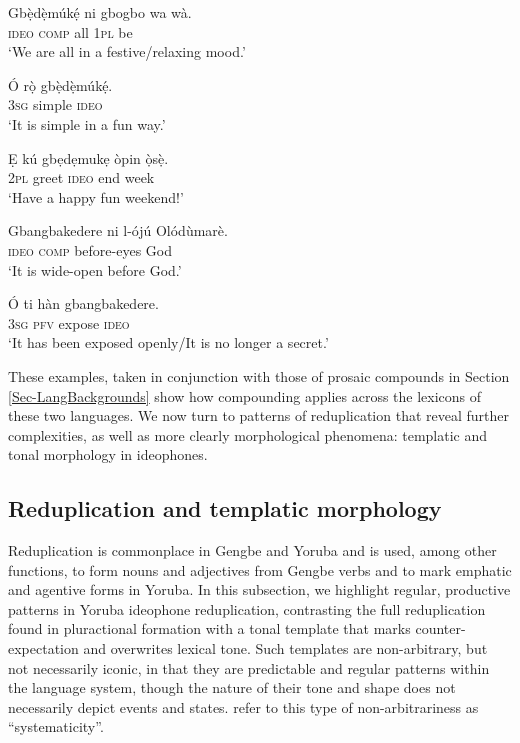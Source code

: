 \documentclass[output=paper,colorlinks,citecolor=brown]{langscibook}
\begin{document}
\ea \label{InlineEx1}
\begin{xlist}
    \ex
    \gll Gbẹ̀dẹ̀múkẹ́    ni     gbogbo wa    wà.\\
    \textsc{ideo}            \textsc{comp}   all    \textsc{1pl}    be \\
   \glt  `We are all in a festive/relaxing mood.'

    \ex	
    \gll Ó  rọ̀    gbẹ̀dẹ̀múkẹ́.\\
        \textsc{3sg} simple \textsc{ideo}\\
    \glt   `It is simple in a fun way.'

        \ex 
        \gll Ẹ		kú	    gbẹdẹmukẹ	òpin ọ̀sẹ̀.\\
        \textsc{2pl} greet   \textsc{ideo}	    end week\\
   \glt     `Have a happy fun weekend!'

        \ex 
        \gll Gbangbakedere	ni	  l-ójú	   Olódùmarè.\\
        \textsc{ideo}		    \textsc{comp}  before-eyes   God\\
   \glt     `It is wide-open before God.'

        \ex 
        \gll Ó	ti	       hàn	    gbangbakedere.\\
    \textsc{3sg}	\textsc{pfv}       expose	\textsc{ideo}\\
   \glt     `It has been exposed openly/It is no longer a secret.'
\end{xlist}
\z

These examples, taken in conjunction with those of prosaic compounds in Section \ref{Sec-LangBackgrounds} show how compounding applies across the lexicons of these two languages. We now turn to patterns of reduplication that reveal further complexities, as well as more clearly morphological phenomena: templatic and tonal morphology in ideophones.

\subsection{Reduplication and templatic morphology}
\label{Redupandtemplatic}

Reduplication  is commonplace in Gengbe and Yoruba and is used, among other functions, to form nouns and adjectives from Gengbe verbs and to mark emphatic and agentive forms in Yoruba. In this subsection, we highlight regular, productive patterns in Yoruba ideophone reduplication, contrasting the full reduplication found in pluractional formation with a tonal template that marks counter-expectation and overwrites lexical tone. Such templates are non-arbitrary, but not necessarily iconic, in that they are predictable and regular patterns within the language system, though the nature of their tone and shape does not necessarily depict events and states. \citet{Dingemanseetal2015} refer to this type of non-arbitrariness  as ``systematicity''.
\end{document}

